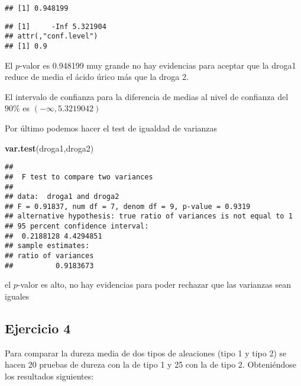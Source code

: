 \documentclass[
]{article}
\newenvironment{Shaded}{\begin{snugshade}}{\end{snugshade}}
\newcommand{\DataTypeTok}[1]{\textcolor[rgb]{0.13,0.29,0.53}{#1}}
\newcommand{\FloatTok}[1]{\textcolor[rgb]{0.00,0.00,0.81}{#1}}
\newcommand{\KeywordTok}[1]{\textcolor[rgb]{0.13,0.29,0.53}{\textbf{#1}}}
\newcommand{\NormalTok}[1]{#1}
\newcommand{\OperatorTok}[1]{\textcolor[rgb]{0.81,0.36,0.00}{\textbf{#1}}}
\newcommand{\OtherTok}[1]{\textcolor[rgb]{0.56,0.35,0.01}{#1}}
\newcommand{\StringTok}[1]{\textcolor[rgb]{0.31,0.60,0.02}{#1}}
\begin{document}
\begin{verbatim}
## [1] 0.948199
\end{verbatim}

\begin{Shaded}
\end{Shaded}

\begin{verbatim}
## [1]     -Inf 5.321904
## attr(,"conf.level")
## [1] 0.9
\end{verbatim}

El \(p\)-valor es 0.948199 muy grande no hay evidencias para aceptar que
la droga1 reduce de media el ácido úrico más que la droga 2.

El intervalo de confianza para la diferencia de medias al nivel de
confianza del \(90\%\) es \((-\infty, 5.3219042)\)

Por último podemos hacer el test de igualdad de varianzas

\begin{Shaded}
\begin{Highlighting}[]
\KeywordTok{var.test}\NormalTok{(droga1,droga2)}
\end{Highlighting}
\end{Shaded}

\begin{verbatim}
## 
##  F test to compare two variances
## 
## data:  droga1 and droga2
## F = 0.91837, num df = 7, denom df = 9, p-value = 0.9319
## alternative hypothesis: true ratio of variances is not equal to 1
## 95 percent confidence interval:
##  0.2188128 4.4294851
## sample estimates:
## ratio of variances 
##          0.9183673
\end{verbatim}

el \(p\)-valor es alto, no hay evidencias para poder rechazar que las
varianzas sean iguales

\hypertarget{ejercicio-4}{%
\subsection{Ejercicio 4}\label{ejercicio-4}}

Para comparar la dureza media de dos tipos de aleaciones (tipo 1 y tipo
2) se hacen 20 pruebas de dureza con la de tipo 1 y 25 con la de tipo 2.
Obteniéndose los resultados siguientes:
\end{document}
